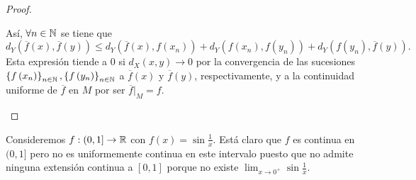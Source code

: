 \begin{proof}
\begin{itemize}
Así, $\displaystyle \forall n \in \mathbb{N} $ se tiene que
\[ d _{Y}\left(\overline{f}\left(x\right), \overline{f}\left(y\right)\right) \leq d _{Y}\left(\overline{f}\left(x\right), f\left(x_{n}\right)\right) + d _{Y}\left(f\left(x_{n}\right), f\left(y_{n}\right)\right) + d _{Y}\left(f\left(y_{n}\right), \overline{f}\left(y\right)\right)  .\]
Esta expresión tiende a 0 si $\displaystyle d _{X}\left(x,y\right) \to 0 $ por la convergencia de las sucesiones $\displaystyle \left\{ f\left(x_{n}\right)\right\} _{n\in\mathbb{N}}, \left\{ f\left(y_{n}\right)\right\} _{n\in\mathbb{N}} $ a $\displaystyle \overline{f}\left(x\right) $ y $\displaystyle \overline{f}\left(y\right) $, respectivamente, y a la continuidad uniforme de $\displaystyle \overline{f} $ en $\displaystyle M $ por ser $\displaystyle \overline{f}|_{M} = f $.
\end{itemize}
\end{proof}
\begin{eg}
	Consideremos $\displaystyle f:(0,1] \to \mathbb{R} $ con $\displaystyle f\left(x\right) = \sin \frac{1}{x} $. Está claro que $\displaystyle f $ es continua en $\displaystyle (0,1] $ pero no es uniformemente continua en este intervalo puesto que no admite ninguna extensión continua a $\displaystyle [0,1] $ porque no existe $\displaystyle \lim_{x \to 0^{+}}\sin \frac{1}{x} $. 
\end{eg}
